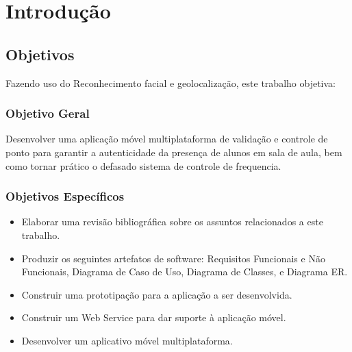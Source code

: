 
\chapter{Introdução}\label{ch:intro}


\section{Objetivos}\label{sec:objetivos}
Fazendo uso do Reconhecimento facial e geolocalização, este trabalho objetiva:

\subsection{Objetivo Geral}\label{subsec:objetivo-geral}
Desenvolver uma aplicação móvel multiplataforma de validação e controle de ponto para garantir a autenticidade da presença de alunos em sala de aula, bem como tornar prático o defasado sistema de controle de frequencia.

\subsection{Objetivos Específicos}\label{subsec:objetivos-especificos}
\begin{itemize}

    \item Elaborar uma revisão bibliográfica sobre os assuntos relacionados a este trabalho.
    \item Produzir os seguintes artefatos de software: Requisitos Funcionais e Não Funcionais,
    Diagrama de Caso de Uso, Diagrama de Classes, e Diagrama ER\@.
    \item Construir uma prototipação para a aplicação a ser desenvolvida.
    \item Construir um Web Service para dar suporte à aplicação móvel.
    \item Desenvolver um aplicativo móvel multiplataforma.

\end{itemize}
